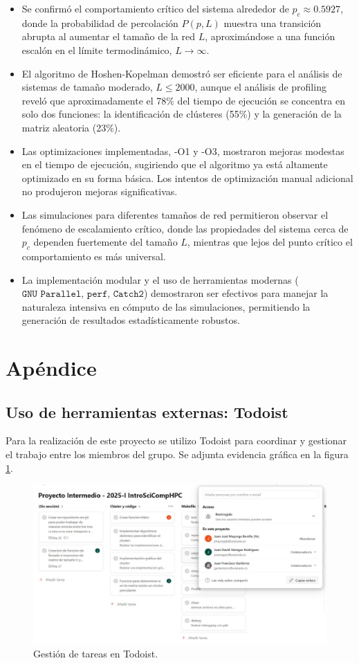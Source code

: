 \documentclass[12pt,a4paper]{article}
\begin{document}
\begin{itemize}
    \item Se confirmó el comportamiento crítico del sistema alrededor de $p_c \approx 0.5927$, donde la probabilidad de percolación $P(p,L)$ muestra una transición abrupta al aumentar el tamaño de la red $L$, aproximándose a una función escalón en el límite termodinámico, $L \rightarrow \infty$.

    \item El algoritmo de Hoshen-Kopelman demostró ser eficiente para el análisis de sistemas de tamaño moderado, $L \leq 2000$, aunque el análisis de profiling reveló que aproximadamente el 78\% del tiempo de ejecución se concentra en solo dos funciones: la identificación de clústeres (55\%) y la generación de la matriz aleatoria (23\%).

    \item Las optimizaciones implementadas, -O1 y -O3, mostraron mejoras modestas en el tiempo de ejecución, sugiriendo que el algoritmo ya está altamente optimizado en su forma básica. Los intentos de optimización manual adicional no produjeron mejoras significativas.

    \item Las simulaciones para diferentes tamaños de red permitieron observar el fenómeno de escalamiento crítico, donde las propiedades del sistema cerca de $p_c$ dependen fuertemente del tamaño $L$, mientras que lejos del punto crítico el comportamiento es más universal.

    \item La implementación modular y el uso de herramientas modernas ($\texttt{GNU Parallel, perf, Catch2}$) demostraron ser efectivos para manejar la naturaleza intensiva en cómputo de las simulaciones, permitiendo la generación de resultados estadísticamente robustos.
\end{itemize}

\section{Apéndice}

\subsection{Uso de herramientas externas: Todoist}
Para la realización de este proyecto se utilizo Todoist para coordinar y gestionar el trabajo entre los miembros del grupo. Se adjunta evidencia gráfica en la figura \ref{fig:7}.

\begin{figure}[H]
    \centering
    \includegraphics[width=0.5\linewidth]{../figures/todoist.png}
    \caption{Gestión de tareas en Todoist.}
    \label{fig:7}
\end{figure}



\end{document}
